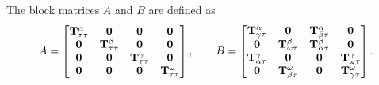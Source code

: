 The block matrices $A$ and $B$ are defined as
\begin{equation}
A = \begin{bmatrix}
\mathbf T^{\alpha}_{\tau\tau} & \mathbf 0 & \mathbf 0 & \mathbf 0 \\
\mathbf 0 & \mathbf T^{\beta}_{\tau\tau} & \mathbf 0 & \mathbf 0  \\
\mathbf 0 & \mathbf 0 & \mathbf T^{\gamma}_{\tau\tau} & \mathbf 0  \\
\mathbf 0& \mathbf 0 & \mathbf 0 & \mathbf T^{\omega}_{\tau\tau} \\
\end{bmatrix}, \qquad
B = \begin{bmatrix}
\mathbf T^{\alpha}_{\gamma\tau} & \mathbf 0              & \mathbf T^{\alpha}_{\beta\tau} & \mathbf 0 \\
\mathbf 0               & \mathbf T^{\beta}_{\omega\tau} & \mathbf T^{\beta}_{\alpha\tau} & \mathbf 0 \\
\mathbf T^{\gamma}_{\alpha\tau} & \mathbf 0              & \mathbf 0              & \mathbf T^{\gamma}_{\omega\tau} \\
\mathbf 0               & \mathbf T^{\omega}_{\beta\tau} & \mathbf 0              & \mathbf T^{\omega}_{\gamma\tau}
\end{bmatrix}.
\label{eq:matrix_AB}
\end{equation}

